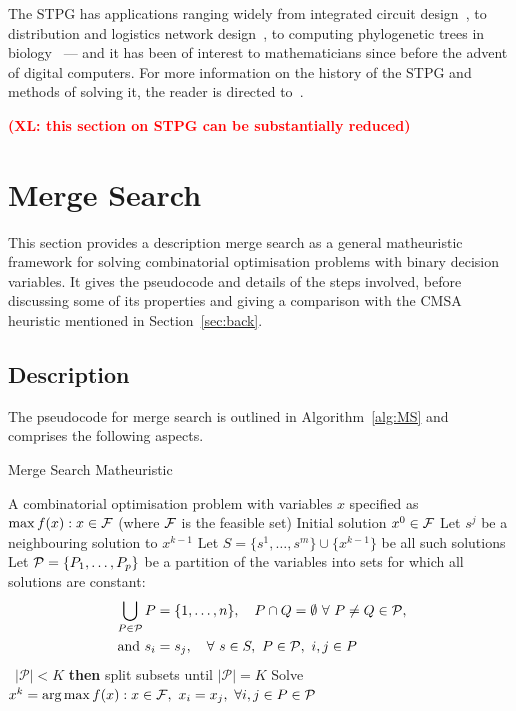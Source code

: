 \documentclass[preprint]{elsarticle}
\newcommand{\xl}[1]{\textbf{\textcolor{red}{(XL: #1)}}}
\begin{document}
The STPG has applications ranging widely from integrated circuit design~\citep{vlsi:cho}, to distribution and logistics network design~\citep{stpg-logistics}, to computing phylogenetic trees in biology~\citep{phylo} --- and it has been of interest to mathematicians since before the advent of digital computers. For more information on the history of the STPG and methods of solving it, the reader is directed to~\citet{history:brazil,steiner:hwang,steinerbook,steineradvance}. 

\xl{this section on STPG can be substantially reduced}

\section{Merge Search}\label{sec:merge}

This section provides a description merge search as a general matheuristic framework for solving combinatorial optimisation problems with binary decision variables. It gives the pseudocode and details of the steps involved, before discussing some of its properties and giving a comparison with the CMSA heuristic mentioned in Section~\ref{sec:back}.

\subsection{Description}
The pseudocode for merge search is outlined in Algorithm~\ref{alg:MS} and comprises the following aspects.

\begin{algorithm}[htb!]
\caption{{\sf Merge Search Matheuristic}} \label{alg:MS}
\begin{algorithmic}[1]
  \Require A combinatorial optimisation problem with variables $x$ specified as $\max f(x) : x\in {\cal F}$ (where ${\cal F}$ is the feasible set)
  \Require Initial solution $x^0\in \cal F$
    \State Let $s^j$ be a neighbouring solution to $x^{k-1}$
    \label{step:nbhd}
      \EndFor
    \State Let  $S=\{s^1,\ldots,s^m\}\cup\{x^{k-1}\}$ be all such solutions
    \State Let ${\cal P}=\{P_1,\ldots,P_p\}$ be a partition of the variables into sets for which all solutions are constant:\label{step:P}
    \begin{align*}
      \bigcup_{P\in {\cal P}} P&=\{1,\ldots,n\},\quad P \cap Q=\emptyset\ \forall\ P\ne Q\in  {\cal P},\\
      \text{ and } s_i &= s_j, \quad \forall\ s\in S,\ P\in {\cal P},\ i,j\in P
    \end{align*}
   \ {$|\mathcal{P}| < K$} {\bf then} split subsets until $|\mathcal{P}|=K$ \label{step:RandSplit}
  \State Solve $x^k=\text{arg}\max f(x) : x\in {\cal F},\ x_i=x_j,\ \forall
  i,j\in P\in{\cal P}$\label{step:merge}
\EndFor
\end{algorithmic}
\end{algorithm}
\end{document}
